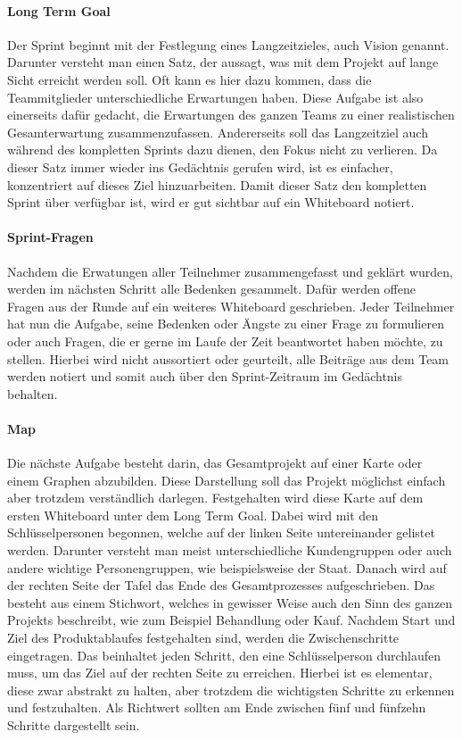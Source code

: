 \paragraph{Long Term Goal}
\label{sec:Sprint-Tag1-LTG}
Der Sprint beginnt mit der Festlegung eines Langzeitzieles, auch Vision genannt. Darunter versteht man einen Satz, der aussagt, was mit dem Projekt auf lange Sicht erreicht werden soll. Oft kann es hier dazu kommen, dass die Teammitglieder unterschiedliche Erwartungen haben. Diese Aufgabe ist also einerseits dafür gedacht, die Erwartungen des ganzen Teams zu einer realistischen Gesamterwartung zusammenzufassen. Andererseits soll das Langzeitziel auch während des kompletten Sprints dazu dienen, den Fokus nicht zu verlieren. Da dieser Satz immer wieder ins Gedächtnis gerufen wird, ist es einfacher, konzentriert auf dieses Ziel hinzuarbeiten. Damit dieser Satz den kompletten Sprint über verfügbar ist, wird er gut sichtbar auf ein Whiteboard notiert. 

\paragraph{Sprint-Fragen}
\label{sec:Sprint-Tag1-Fragen}
Nachdem die Erwatungen aller Teilnehmer zusammengefasst und geklärt wurden, werden im nächsten Schritt alle Bedenken gesammelt. Dafür werden offene Fragen aus der Runde auf ein weiteres Whiteboard geschrieben. Jeder Teilnehmer hat nun die Aufgabe, seine Bedenken oder Ängste zu einer Frage zu formulieren oder auch Fragen, die er gerne im Laufe der Zeit beantwortet haben möchte, zu stellen. Hierbei wird nicht aussortiert oder geurteilt, alle Beiträge aus dem Team werden notiert und somit auch über den Sprint-Zeitraum im Gedächtnis behalten. 

\paragraph{Map}
\label{sec:Sprint-Tag1-Map}
Die nächste Aufgabe besteht darin, das Gesamtprojekt auf einer Karte oder einem Graphen abzubilden. Diese Darstellung soll das Projekt möglichst einfach aber trotzdem verständlich darlegen. Festgehalten wird diese Karte auf dem ersten Whiteboard unter dem Long Term Goal. Dabei wird mit den Schlüsselpersonen begonnen, welche auf der linken Seite untereinander gelistet werden. Darunter versteht man meist unterschiedliche Kundengruppen oder auch andere wichtige Personengruppen, wie beispielsweise der Staat. Danach wird auf der rechten Seite der Tafel das Ende des Gesamtprozesses aufgeschrieben. Das besteht aus einem Stichwort, welches in gewisser Weise auch den Sinn des ganzen Projekts beschreibt, wie zum Beispiel Behandlung oder Kauf. Nachdem Start und Ziel des Produktablaufes festgehalten sind, werden die Zwischenschritte eingetragen. Das beinhaltet jeden Schritt, den eine Schlüsselperson durchlaufen muss, um das Ziel auf der rechten Seite zu erreichen. Hierbei ist es elementar, diese zwar abstrakt zu halten, aber trotzdem die wichtigsten Schritte zu erkennen und festzuhalten. Als Richtwert sollten am Ende zwischen fünf und fünfzehn Schritte dargestellt sein.

